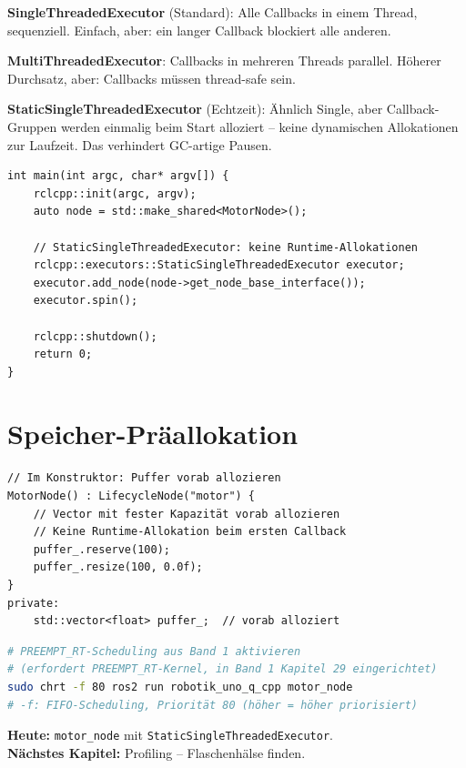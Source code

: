 \begin{wissenBox}
\textbf{SingleThreadedExecutor} (Standard):
Alle Callbacks in einem Thread, sequenziell.
Einfach, aber: ein langer Callback blockiert alle anderen.

\textbf{MultiThreadedExecutor}:
Callbacks in mehreren Threads parallel.
Höherer Durchsatz, aber: Callbacks müssen thread-safe sein.

\textbf{StaticSingleThreadedExecutor} (Echtzeit):
Ähnlich Single, aber Callback-Gruppen werden einmalig beim Start
alloziert -- keine dynamischen Allokationen zur Laufzeit.
Das verhindert GC-artige Pausen.

\begin{lstlisting}[style=cpp]
int main(int argc, char* argv[]) {
    rclcpp::init(argc, argv);
    auto node = std::make_shared<MotorNode>();

    // StaticSingleThreadedExecutor: keine Runtime-Allokationen
    rclcpp::executors::StaticSingleThreadedExecutor executor;
    executor.add_node(node->get_node_base_interface());
    executor.spin();

    rclcpp::shutdown();
    return 0;
}
\end{lstlisting}
\end{wissenBox}

\section{Speicher-Präallokation}

\begin{lstlisting}[style=cpp]
// Im Konstruktor: Puffer vorab allozieren
MotorNode() : LifecycleNode("motor") {
    // Vector mit fester Kapazität vorab allozieren
    // Keine Runtime-Allokation beim ersten Callback
    puffer_.reserve(100);
    puffer_.resize(100, 0.0f);
}
private:
    std::vector<float> puffer_;  // vorab alloziert
\end{lstlisting}

\begin{lstlisting}[language=bash]
# PREEMPT_RT-Scheduling aus Band 1 aktivieren
# (erfordert PREEMPT_RT-Kernel, in Band 1 Kapitel 29 eingerichtet)
sudo chrt -f 80 ros2 run robotik_uno_q_cpp motor_node
# -f: FIFO-Scheduling, Priorität 80 (höher = höher priorisiert)
\end{lstlisting}

\begin{projektBox}
\textbf{Heute:} \texttt{motor\_node} mit \texttt{StaticSingleThreadedExecutor}.\\
\textbf{Nächstes Kapitel:} Profiling -- Flaschenhälse finden.
\end{projektBox}


